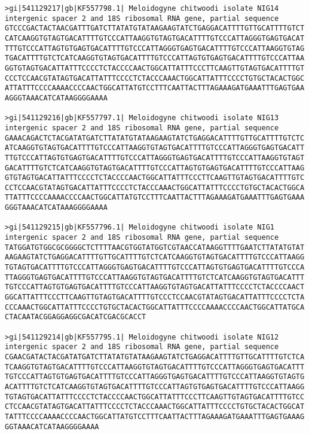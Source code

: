 \documentclass[11pt]{article}
\begin{document}
\begin{Verbatim}[commandchars=\\\{\}]
>gi|541129217|gb|KF557798.1| Meloidogyne chitwoodi isolate NIG14 intergenic spacer 2 and 18S ribosomal RNA gene, partial sequence
GTCCCGACTACTAACGATTTGATCTTATATGTATAAGAAGTATCTGAGGACATTTTGTTGCATTTTGTCT
CATCAAGGTGTAGTGACATTTTGTCCCATTAAGGTGTAGTGACATTTTGTCCCATTAGGGTGAGTGACAT
TTTGTCCCATTAGTGTGAGTGACATTTTGTCCCATTAGGGTGAGTGACATTTTGTCCCATTAAGGTGTAG
TGACATTTTGTCTCATCAAGGTGTAGTGACATTTTGTCCCATTAGTGTGAGTGACATTTTGTCCCATTAA
GGTGTAGTGACATTATTTCCCCTCTACCCCAACTGGCATTATTTCCCTTCAAGTTGTAGTGACATTTTGT
CCCTCCAACGTATAGTGACATTATTTCCCCTCTACCCAAACTGGCATTATTTCCCCTGTGCTACACTGGC
ATTATTTCCCCAAAACCCCAACTGGCATTATGTCCTTTCAATTACTTTAGAAAGATGAAATTTGAGTGAA
AGGGTAAACATCATAAGGGGAAAA

>gi|541129216|gb|KF557797.1| Meloidogyne chitwoodi isolate NIG13 intergenic spacer 2 and 18S ribosomal RNA gene, partial sequence
GAAACAGACTCTACGATATGATCTTATATGTATAAGAAGTATCTGAGGACATTTTGTTGCATTTTGTCTC
ATCAAGGTGTAGTGACATTTTGTCCCATTAAGGTGTAGTGACATTTTGTCCCATTAGGGTGAGTGACATT
TTGTCCCATTAGTGTGAGTGACATTTTGTCCCATTAGGGTGAGTGACATTTTGTCCCATTAAGGTGTAGT
GACATTTTGTCTCATCAAGGTGTAGTGACATTTTGTCCCATTAGTGTGAGTGACATTTTGTCCCATTAAG
GTGTAGTGACATTATTTCCCCTCTACCCCAACTGGCATTATTTCCCTTCAAGTTGTAGTGACATTTTGTC
CCTCCAACGTATAGTGACATTATTTCCCCTCTACCCAAACTGGCATTATTTCCCCTGTGCTACACTGGCA
TTATTTCCCCAAAACCCCAACTGGCATTATGTCCTTTCAATTACTTTAGAAAGATGAAATTTGAGTGAAA
GGGTAAACATCATAAAGGGGAAAA

>gi|541129215|gb|KF557796.1| Meloidogyne chitwoodi isolate NIG1 intergenic spacer 2 and 18S ribosomal RNA gene, partial sequence
TATGGATGTGGCGCGGGGCTCTTTTAACGTGGTATGGTCGTAACCATAAGGTTTTGAATCTTATATGTAT
AAGAAGTATCTGAGGACATTTTGTTGCATTTTGTCTCATCAAGGTGTAGTGACATTTTGTCCCATTAAGG
TGTAGTGACATTTTGTCCCATTAGGGTGAGTGACATTTTGTCCCATTAGTGTGAGTGACATTTTGTCCCA
TTAGGGTGAGTGACATTTTGTCCCATTAAGGTGTAGTGACATTTTGTCTCATCAAGGTGTAGTGACATTT
TGTCCCATTAGTGTGAGTGACATTTTGTCCCATTAAGGTGTAGTGACATTATTTCCCCTCTACCCCAACT
GGCATTATTTCCCTTCAAGTTGTAGTGACATTTTGTCCCTCCAACGTATAGTGACATTATTTCCCCTCTA
CCCAAACTGGCATTATTTCCCCTGTGCTACACTGGCATTATTTCCCCAAAACCCCAACTGGCATTATGCA
CTACAATACGGAGGAGGCGACATCGACGCACCT

>gi|541129214|gb|KF557795.1| Meloidogyne chitwoodi isolate NIG12 intergenic spacer 2 and 18S ribosomal RNA gene, partial sequence
CGAACGATACTACGATATGATCTTATATGTATAAGAAGTATCTGAGGACATTTTGTTGCATTTTGTCTCA
TCAAGGTGTAGTGACATTTTGTCCCATTAAGGTGTAGTGACATTTTGTCCCATTAGGGTGAGTGACATTT
TGTCCCATTAGTGTGAGTGACATTTTGTCCCATTAGGGTGAGTGACATTTTGTCCCATTAAGGTGTAGTG
ACATTTTGTCTCATCAAGGTGTAGTGACATTTTGTCCCATTAGTGTGAGTGACATTTTGTCCCATTAAGG
TGTAGTGACATTATTTCCCCTCTACCCCAACTGGCATTATTTCCCTTCAAGTTGTAGTGACATTTTGTCC
CTCCAACGTATAGTGACATTATTTCCCCTCTACCCAAACTGGCATTATTTCCCCTGTGCTACACTGGCAT
TATTTCCCCAAAACCCCAACTGGCATTATGTCCTTTCAATTACTTTAGAAAGATGAAATTTGAGTGAAAG
GGTAAACATCATAAGGGGAAAA


\end{Verbatim}
\end{document}

